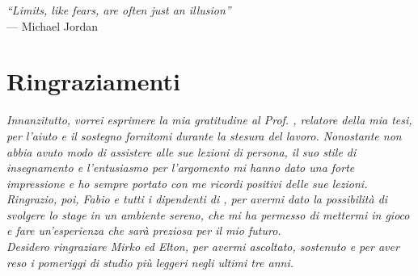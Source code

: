 
\cleardoublepage
{}
{}

\begin{flushright}{
		\slshape
		``Limits, like fears, are often just an illusion''} \\
	\medskip
	--- Michael Jordan
\end{flushright}

\bigskip

\begingroup
\let\clearpage\relax
\let\cleardoublepage\relax
\let\cleardoublepage\relax

\chapter*{Ringraziamenti}


\noindent \textit{Innanzitutto, vorrei esprimere la mia gratitudine al Prof.
	\myProf, relatore della mia tesi, per l'aiuto e il sostegno fornitomi
	durante
	la stesura del lavoro. Nonostante non abbia avuto modo di assistere
	alle sue
	lezioni di persona, il suo stile di insegnamento e l'entusiasmo per
	l'argomento
	mi hanno dato una forte impressione e ho sempre portato con me ricordi
	positivi delle sue lezioni.}\\


\noindent \textit{Ringrazio, poi, Fabio e tutti i dipendenti di \myCompany, per
	avermi dato la possibilità di svolgere lo stage in un ambiente sereno,
	che		 mi ha permesso di mettermi in gioco e fare un'esperienza che
	sarà preziosa		   per il mio futuro.}\\

\noindent \textit{Desidero ringraziare Mirko ed Elton, per avermi ascoltato,
	sostenuto e per aver reso i pomeriggi di studio più leggeri negli
	ultimi tre
	anni.}\\

